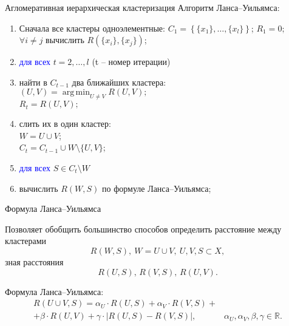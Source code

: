 \documentclass[unicode, notheorems, pdf]{beamer}
\DeclareMathOperator*{\argmin}{arg\,\min}
\begin{document}
\begin{frame}{Агломеративная иерархическая кластеризация}
	Алгоритм Ланса--Уильямса:
	\begin{enumerate}
		\item Сначала все кластеры одноэлементные:
			$C_1=\left\{\{x_1\},\dots,\{x_l\}\right\}$; $R_1=0;$\\
			$\forall i\not=j$ вычислить $R\left(\{x_i\},\{x_j\}\right)$;
		\item\textcolor{blue}{для всех} $t=2,\dots,l$ (t -- номер итерации)
		\item\hspace{.5cm}найти в $C_{t-1}$ два ближайших кластера:\\
			\hspace{.5cm}$\displaystyle(U,V)=\argmin_{U \not= V}R(U,V);$\\
			\hspace{.5cm}$R_t=R(U,V);$
		\item\hspace{.5cm}слить их в один кластер:\\
			\hspace{.5cm}$W=U\cup V$;\\
			\hspace{.5cm}$C_t=C_{t-1}\cup W\setminus\{U,V\}$;
		\item\hspace{.5cm}\textcolor{blue}{для всех} $S \in C_t \setminus W$
		\item\hspace{1cm}вычислить $R(W,S)$ по формуле Ланса--Уильямса;
	\end{enumerate}
\end{frame}

\begin{frame}{Формула Ланса--Уильямса}

	Позволяет обобщить большинство способов определить расстояние между кластерами 
	\[R(W,S),\:W=U\cup V,\:U,V,S\subset X,\] 
	зная расстояния 
	\[R(U,S),\,R(V,S),\,R(U,V).\]

	\pause
	\vspace{.5cm}
	Формула Ланса--Уильямса:
	\begin{eqnarray*}
		R(U\cup V,S)=\alpha_U\cdot R(U,S)+\alpha_V\cdot R(V,S)+&\\
		+\beta\cdot R(U,V)+\gamma\cdot |R(U,S)-R(V,S)|,&\alpha_U,\alpha_V,\beta,\gamma\in\mathbb{R}.
	\end{eqnarray*}
\end{frame}
\end{document}
